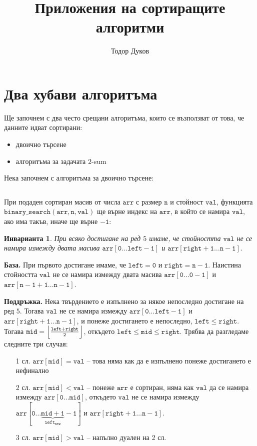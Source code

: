 \documentclass{article}
\title{Приложения на сортиращите алгоритми}
\author{Тодор Дуков}
\date{}
\theoremstyle{definition}
\theoremstyle{plain}
\newtheorem*{invariant}{Инварианта}
\theoremstyle{remark}
\theoremstyle{definition}
\begin{document}
\maketitle

\section*{Два хубави алгоритъма}

Ще започнем с два често срещани алгоритъма, които се възползват от това, че данните идват сортирани:
\begin{itemize}
    \item двоично търсене
    \item алгоритъма за задачата $2$-sum
\end{itemize}

Нека започнем с алгоритъма за двоично търсене:
\inputminted[linenos]{c++}{algorithms/binary_search.cpp}

При подаден сортиран масив от числа $\mathtt{arr}$ с размер $\mathtt{n}$ и стойност $\mathtt{val}$, функцията $\mathtt{binary\_search(arr, n, val)}$ ще върне индекс на $\mathtt{arr}$, в който се намира $\mathtt{val}$, ако има такъв, иначе ще върне $\mathtt{-1}$:
\begin{invariant}
    При всяко достигане на ред $5$ имаме, че стойността $\mathtt{val}$ не се намира измежду двата масива $\mathtt{arr[0 \dots left - 1]}$ и $\mathtt{arr[right + 1 \dots n - 1]}$.
\end{invariant}

\textbf{База.}
При първото достигане имаме, че $\mathtt{left = 0}$ и $\mathtt{right = n - 1}$.
Наистина стойността $\mathtt{val}$ не се намира измежду двата масива $\mathtt{arr[0 \dots 0 -1]}$ и $\mathtt{arr[n - 1 + 1 \dots n - 1]}$.

\textbf{Поддръжка.}
Нека твърдението е изпълнено за някое непоследно достигане на ред $5$.
Тогава $\mathtt{val}$ не се намира измежду $\mathtt{arr[0 \dots left - 1]}$ и $\mathtt{arr[right + 1 \dots n - 1]}$, и понеже достигането е непоследно, $\mathtt{left \leq right}$.
Тогава $\mathtt{mid = \Bigl\lfloor \frac{left + right}{2} \Bigr\rfloor}$, откъдето $\mathtt{left \leq mid \leq right}$.
Трябва да разгледаме следните три случая:
\begin{itemize}
    \item[1 сл.] $\mathtt{arr[mid] = val}$ -- това няма как да е изпълнено понеже достигането е нефинално
    \item[2 сл.] $\mathtt{arr[mid] < val}$ -- понеже $\mathtt{arr}$ е сортиран, няма как $\mathtt{val}$ да се намира измежду $\mathtt{arr[0 \dots mid]}$, откъдето $\mathtt{val}$ не се намира измежду $\mathtt{arr[0 \dots \underbrace{\mathtt{mid + 1}}_{left_{new}} - 1]}$ и $\mathtt{arr[right + 1 \dots n - 1]}$.
    \item[3 сл.] $\mathtt{arr[mid] > val}$ -- напълно дуален на 2 сл.
\end{itemize}
\end{document}
